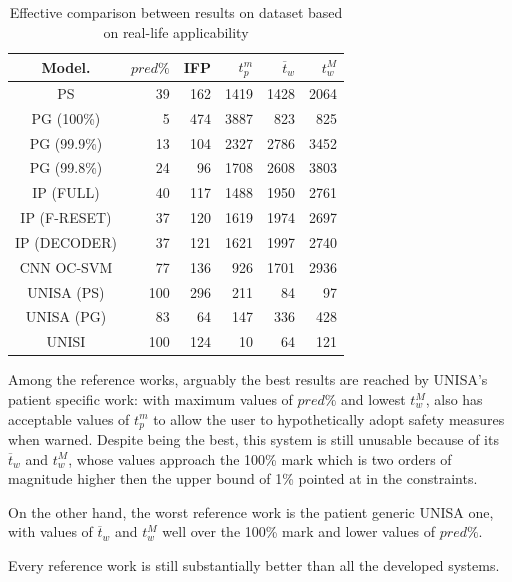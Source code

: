 \begin{table}[ht]
    \centering
    \begin{tabular}{c|rrrrr}
    Model.  & $pred\%$ & IFP & $t_p^m$  & $\overline{t}_w$  & $t_w^M$   \\ \hline
    PS           & 39   & 162   & 1419  & 1428     & 2064     \\
    PG (100\%)   & 5    & 474   & 3887  & 823      & 825      \\
    PG (99.9\%)  & 13   & 104   & 2327  & 2786     & 3452     \\
    PG (99.8\%)  & 24   & 96    & 1708  & 2608     & 3803     \\
    IP (FULL)    & 40   & 117   & 1488  & 1950     & 2761     \\
    IP (F-RESET) & 37   & 120   & 1619  & 1974     & 2697     \\
    IP (DECODER) & 37   & 121   & 1621  & 1997     & 2740     \\
    CNN OC-SVM   & 77   & 136   & 926   & 1701     & 2936     \\
    UNISA (PS)   & 100  & 296   & 211   & 84       & 97       \\
    UNISA (PG)   & 83   & 64    & 147   & 336      & 428      \\
    UNISI        & 100  & 124   & 10    & 64       & 121      \\  \hline
    \end{tabular}
    \caption{Effective comparison between results on  dataset based on real-life applicability}
    \label{tab:real-life-comparison} 
\end{table}

Among the reference works, arguably the best results are reached by \gls{UNISA}'s patient specific work: with maximum values of $pred\%$ and lowest $t_w^M$, also has acceptable values of $t_p^m$ to allow the user to hypothetically adopt safety measures when warned. Despite being the best, this system is still unusable because of its $\overline{t}_w$ and $t_w^M$, whose values approach the 100\% mark which is two orders of magnitude higher then the upper bound of 1\% pointed at in the constraints.

On the other hand, the worst reference work is the patient generic \gls{UNISA} one, with values of  $\overline{t}_w$ and $t_w^M$ well over the 100\% mark and lower values of $pred\%$.

Every reference work is still substantially better than all the developed systems.

